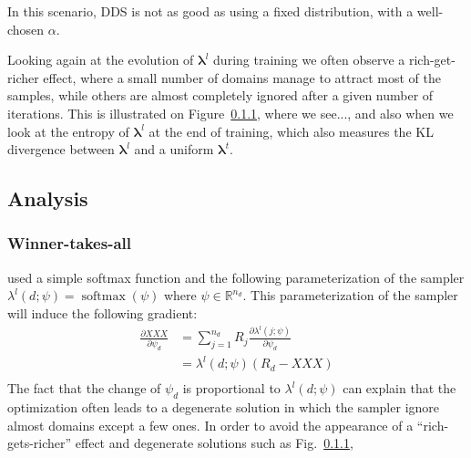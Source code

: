 \documentclass[11pt,a4paper]{article}
\newcommand{\fyTodo}[1]{\Todo[FY:]{\textcolor{orange}{#1}}}
\newcommand{\vlambda}{\ensuremath{\boldsymbol\lambda}\xspace} %
\begin{document}
In this scenario, DDS is not as good as using a fixed distribution, with a well-chosen $\alpha$.

Looking again at the evolution of $\vlambda^l$ during training we often observe a rich-get-richer effect, where a small number of domains manage to attract most of the samples, while others are almost completely ignored after a given number of iterations. This is illustrated on Figure~\ref{}, where we see..., and also when we look at the entropy of $\vlambda^l$ at the end of training, which also measures the KL divergence between $\vlambda^l$ and a uniform $\vlambda^t$.\fyTodo{Give numbers}

\subsection{Analysis}
\subsubsection{Winner-takes-all}
\cite{Wang20balancing} used a simple softmax function and the following parameterization of the sampler $\lambda^l(d;\psi) = \operatorname{softmax}(\psi)$ where $\psi \in \mathbb{R}^{n_d}$. This parameterization of the sampler will induce the following gradient:\fyTodo{Change name of obj. function}
\begin{align*}
\frac{\partial XXX}{\partial \psi_d} & = \displaystyle{\mathop{\sum}_{j=1}^{n_d}} R_j \frac{\partial \lambda^l(j; \psi)}{\partial \psi_d} \\
	& = \lambda^l(d; \psi) (R_d- XXX)\\
\end{align*} 
The fact that the change of $\psi_d$ is proportional to $\lambda^l(d; \psi)$ can explain that the optimization often leads to a degenerate solution in which the sampler ignore almost domains except a few ones. In order to avoid the appearance of a ``rich-gets-richer'' effect and degenerate solutions such as Fig.~\ref{},
\end{document}
